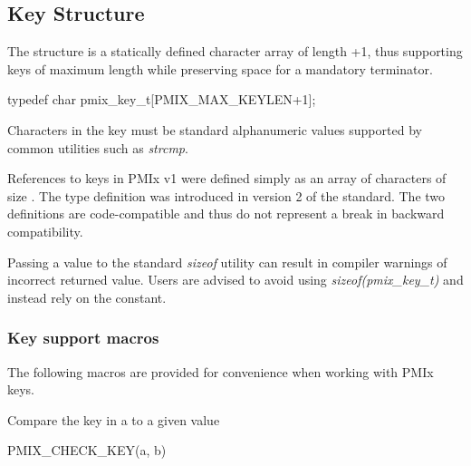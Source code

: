 \subsection{Key Structure}

The  structure is a statically defined character array of length +1, thus supporting keys of maximum length  while preserving space for a mandatory  terminator.

\cspecificstart
\begin{codepar}
typedef char pmix_key_t[PMIX_MAX_KEYLEN+1];
\end{codepar}
\cspecificend

Characters in the key must be standard alphanumeric values supported by common utilities such as \textit{strcmp}.

\adviceuserstart
References to keys in \ac{PMIx} v1 were defined simply as an array of characters of size . The  type definition was introduced in version 2 of the standard. The two definitions are code-compatible and thus do not represent a break in backward compatibility.

Passing a  value to the standard \textit{sizeof} utility can result in compiler warnings of incorrect returned value. Users are advised to avoid using \textit{sizeof(pmix_key_t)} and instead rely on the  constant.
\adviceuserend

\subsubsection{Key support macros}

The following macros are provided for convenience when working with \ac{PMIx} keys.


Compare the key in a  to a given value

\cspecificstart
\begin{codepar}
PMIX_CHECK_KEY(a, b)
\end{codepar}
\cspecificend

\begin{arglist}
\end{arglist}

